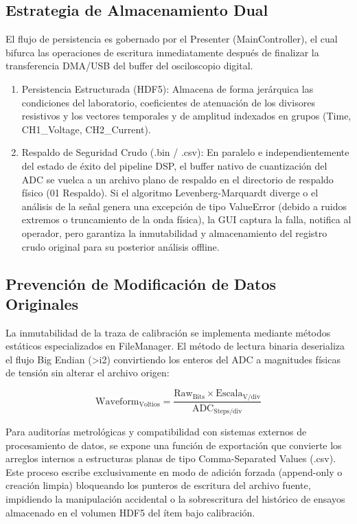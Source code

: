 \subsection{Estrategia de Almacenamiento Dual}
El flujo de persistencia es gobernado por el Presenter (MainController), el cual bifurca las operaciones de escritura inmediatamente después de finalizar la transferencia DMA/USB del buffer del osciloscopio digital.
\begin{enumerate}
    \item Persistencia Estructurada (HDF5): Almacena de forma jerárquica las condiciones del laboratorio, coeficientes de atenuación de los divisores resistivos y los vectores temporales y de amplitud indexados en grupos (Time, CH1\_Voltage, CH2\_Current).
    \item Respaldo de Seguridad Crudo (.bin / .csv): En paralelo e independientemente del estado de éxito del pipeline DSP, el buffer nativo de cuantización del ADC se vuelca a un archivo plano de respaldo en el directorio de respaldo físico (01 Respaldo). Si el algoritmo Levenberg-Marquardt diverge o el análisis de la señal genera una excepción de tipo ValueError (debido a ruidos extremos o truncamiento de la onda física), la GUI captura la falla, notifica al operador, pero garantiza la inmutabilidad y almacenamiento del registro crudo original para su posterior análisis offline.
\end{enumerate}

\subsection{Prevención de Modificación de Datos Originales}
La inmutabilidad de la traza de calibración se implementa mediante métodos estáticos especializados en FileManager. El método de lectura binaria deserializa el flujo Big Endian (>i2) convirtiendo los enteros del ADC a magnitudes físicas de tensión sin alterar el archivo origen:

$$\text{Waveform}_{\text{Voltios}} = \frac{\text{Raw}_{\text{Bits}} \times \text{Escala}_{\text{V/div}}}{\text{ADC}_{\text{Steps/div}}}$$

Para auditorías metrológicas y compatibilidad con sistemas externos de procesamiento de datos, se expone una función de exportación que convierte los arreglos internos a estructuras planas de tipo Comma-Separated Values (.csv). Este proceso escribe exclusivamente en modo de adición forzada (append-only o creación limpia) bloqueando los punteros de escritura del archivo fuente, impidiendo la manipulación accidental o la sobrescritura del histórico de ensayos almacenado en el volumen HDF5 del ítem bajo calibración.

